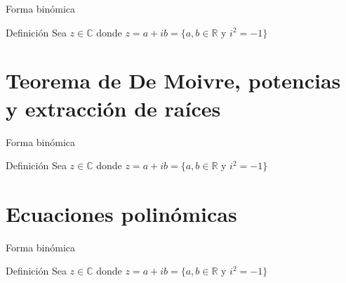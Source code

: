 \begin{frame}[c]{Forma binómica}
  \begin{block}{Definición}
  Sea $z \in \mathbb{C}$ donde $z = a + ib = \{ a,b \in \mathbb{R}$ y $ i^2
  = -1 \}$
  \end{block}
\end{frame}

\section{Teorema de De Moivre, potencias y extracción de raíces}

\begin{frame}[c]{Forma binómica}
  \begin{block}{Definición}
  Sea $z \in \mathbb{C}$ donde $z = a + ib = \{ a,b \in \mathbb{R}$ y $ i^2
  = -1 \}$
  \end{block}
\end{frame}

\section{Ecuaciones polinómicas}

\begin{frame}[c]{Forma binómica}
  \begin{block}{Definición}
  Sea $z \in \mathbb{C}$ donde $z = a + ib = \{ a,b \in \mathbb{R}$ y $ i^2
  = -1 \}$
  \end{block}
\end{frame}
